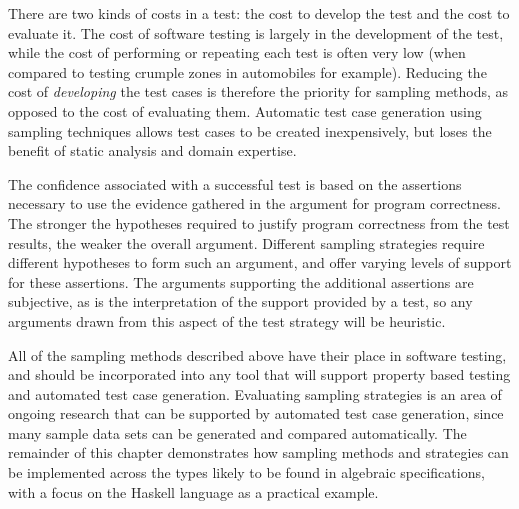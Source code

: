 There are two kinds of costs in a test:
the cost to develop the test and the cost to evaluate it.
The cost of software testing is largely in the development of the test,
while the cost of performing or repeating each test is often very low
(when compared to testing crumple zones in automobiles for example).
Reducing the cost of \emph{developing} the test cases is 
therefore the priority for sampling methods,
as opposed to the cost of evaluating them.
Automatic test case generation using sampling techniques 
allows test cases to be created inexpensively,
but loses the benefit of static analysis and domain expertise.

The confidence associated with a successful test 
is based on the assertions necessary to use the evidence gathered
in the argument for program correctness.
The stronger the hypotheses required to justify program correctness  from the test results,
the weaker the overall argument.
Different sampling strategies require different hypotheses to form such an argument,
and offer varying levels of support for these assertions.
The arguments supporting the additional assertions are subjective,
as is the interpretation of the support provided by a test,
so any arguments drawn from this aspect of the test strategy will be heuristic.

All of the sampling methods described above have their place in software testing,
and should be incorporated into any tool that will support property based testing
and automated test case generation.
Evaluating sampling strategies is an area of ongoing research
that can be supported by automated test case generation,
since many sample data sets can be generated and compared automatically.
The remainder of this chapter demonstrates how 
sampling methods and strategies can be implemented
across the types likely to be found in algebraic specifications,
with a focus on the Haskell language as a practical example.

